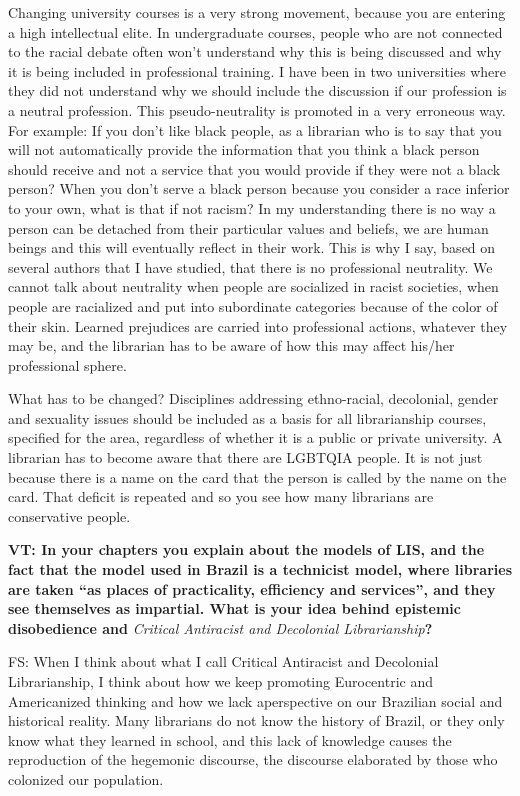 \documentclass[a4paper,
fontsize=11pt,
oneside,
numbers=noperiodatend,
parskip=half-,
bibliography=totoc,
final
]{scrartcl}
\begin{document}
Changing university courses is a very strong movement, because you are
entering a high intellectual elite. In undergraduate courses, people who
are not connected to the racial debate often won't understand why this
is being discussed and why it is being included in professional
training. I have been in two universities where they did not understand
why we should include the discussion if our profession is a neutral
profession. This pseudo-neutrality is promoted in a very erroneous way.
For example: If you don't like black people, as a librarian who is to
say that you will not automatically provide the information that you
think a black person should receive and not a service that you would
provide if they were not a black person? When you don't serve a black
person because you consider a race inferior to your own, what is that if
not racism? In my understanding there is no way a person can be detached
from their particular values and beliefs, we are human beings and this
will eventually reflect in their work. This is why I say, based on
several authors that I have studied, that there is no professional
neutrality. We cannot talk about neutrality when people are socialized
in racist societies, when people are racialized and put into subordinate
categories because of the color of their skin. Learned prejudices are
carried into professional actions, whatever they may be, and the
librarian has to be aware of how this may affect his/her professional
sphere.

What has to be changed? Disciplines addressing ethno-racial, decolonial,
gender and sexuality issues should be included as a basis for all
librarianship courses, specified for the area, regardless of whether it
is a public or private university. A librarian has to become aware that
there are LGBTQIA people. It is not just because there is a name on the
card that the person is called by the name on the card. That deficit is
repeated and so you see how many librarians are conservative people.

\textbf{VT: In your chapters you explain about the models of LIS, and
the fact that the model used in Brazil is a technicist model, where
libraries are taken \enquote{as places of practicality, efficiency and
services}, and they see themselves as impartial. What is your idea
behind epistemic disobedience and} \emph{Critical Antiracist and
Decolonial Librarianship}\textbf{?}

FS: When I think about what I call Critical Antiracist and Decolonial
Librarianship, I think about how we keep promoting Eurocentric and
Americanized thinking and how we lack aperspective on our Brazilian
social and historical reality. Many librarians do not know the history
of Brazil, or they only know what they learned in school, and this lack
of knowledge causes the reproduction of the hegemonic discourse, the
discourse elaborated by those who colonized our population.
\end{document}
